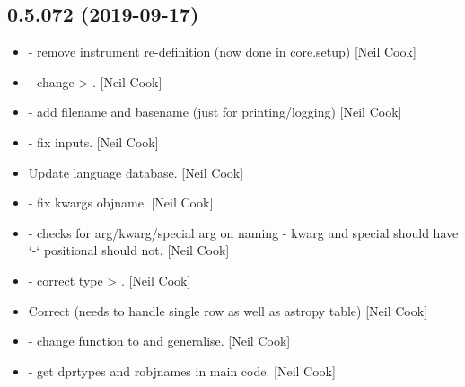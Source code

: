 \documentclass[a4paper,10pt,english]{report}
\begin{document}
\subsection{0.5.072 (2019-09-17)}
\label{\detokenize{misc/changelog:id71}}\begin{itemize}
\item {} 
 - remove instrument re-definition (now done in
core.setup) {[}Neil Cook{]}

\item {} 
 - change  \textendash{}\textgreater{} . {[}Neil
Cook{]}

\item {} 
 - add filename and basename (just for
printing/logging) {[}Neil Cook{]}

\item {} 
 - fix inputs. {[}Neil Cook{]}

\item {} 
Update language database. {[}Neil Cook{]}

\item {} 
 - fix kwargs \textendash{}objname.
{[}Neil Cook{]}

\item {} 
 - checks for arg/kwarg/special arg on naming
- kwarg and special should have ‘-‘ positional should not. {[}Neil Cook{]}

\item {} 
 - correct type  \textendash{}\textgreater{}
. {[}Neil Cook{]}

\item {} 
Correct  (needs to handle single row as well as astropy
table) {[}Neil Cook{]}

\item {} 
 - change function  to
 and generalise. {[}Neil Cook{]}

\item {} 
 - get dprtypes and robjnames
in main code. {[}Neil Cook{]}


\end{itemize}
\end{document}
